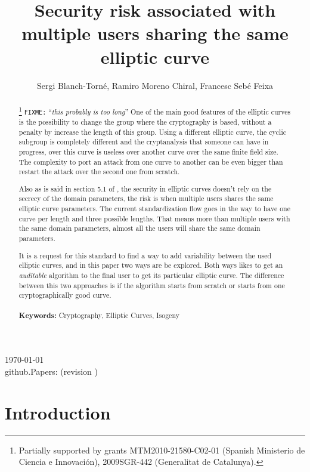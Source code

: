 \documentclass[10pt,a4paper,twoside]{llncs}
\title{Security risk associated with multiple users sharing the same elliptic curve}
\author{Sergi Blanch-Torn\'e\inst{1}, Ramiro Moreno Chiral\inst{2}, Francesc Seb\'e Feixa\inst{2}}
\institute{
 Escola Polit\`ecnica Superior, Universitat de Lleida. Spain.\\
 \email{\tt sblanch@alumnes.udl.es}
 \and 
 Departament de Matem\`atica. Universitat de Lleida. Spain.\\
 \email{\tt \{ramiro,fsebe\}@matematica.udl.es}
 }
\newcommand{\version}{github.Papers: \gitCommitterDate\;(revision \gitAbbrevHash) }
\newcommand{\fixme}[1]{\texttt{\color{red}FIXME:} ``\emph{#1}''}
\begin{document}
\maketitle
\begin{center}
 \today\\
 \version
\end{center}


\begin{abstract}\footnote{Partially supported by grants MTM2010-21580-C02-01 (Spanish Ministerio de Ciencia e Innovaci\'on), 2009SGR-442 (Generalitat de Catalunya).}
\fixme{this probably is too long}
One of the main good features of the elliptic curves is the possibility to change the group where the cryptography is based, without a penalty by increase the length of this group. Using a different elliptic curve, the cyclic subgroup is completely different and the cryptanalysis that someone can have in progress, over this curve is useless over another curve over the same finite field size. The complexity to port an attack from one curve to another can be even bigger than restart the attack over the second one from scratch.

Also as is said in section 5.1 of \cite{X9.62-1998}, the security in elliptic curves doesn't rely on the secrecy of the domain parameters, the risk is when multiple users shares the same elliptic curve parameters. The current standardization \cite{rfc6637} flow goes in the way to have one curve per length and three possible lengths. That means more than multiple users with the same domain parameters, almost all the users will share the same domain parameters.

It is a request for this standard to find a way to add variability between the used elliptic curves, and in this paper two ways are be explored. Both ways likes to get an \emph{auditable} algorithm to the final user to get its particular elliptic curve. The difference between this two approaches is if the algorithm starts from scratch or starts from one cryptographically good curve.
\\\\    
{\bf Keywords:} Cryptography, Elliptic Curves, Isogeny
\end{abstract}

\section{Introduction \label{sec:intro}}
\end{document}
